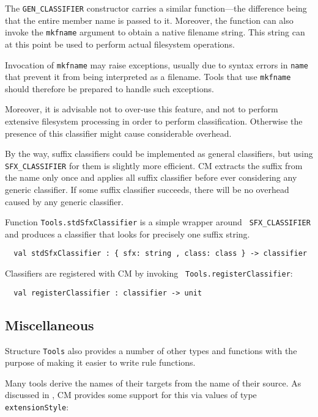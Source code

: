 The {\tt GEN\_CLASSIFIER} constructor carries a similar function---the
difference being that the entire member name is passed to it.
Moreover, the function can also invoke the {\tt mkfname} argument to
obtain a native filename string.  This string can at this point be
used to perform actual filesystem operations.

Invocation of {\tt mkfname} may raise exceptions, usually due to
syntax errors in {\tt name} that prevent it from being interpreted as
a filename.  Tools that use {\tt mkfname} should therefore be prepared
to handle such exceptions.

Moreover, it is advisable not to over-use this feature, and not to
perform extensive filesystem processing in order to perform
classification.  Otherwise the presence of this classifier might cause
considerable overhead.

By the way, suffix classifiers could be implemented as general
classifiers, but using {\tt SFX\_CLASSIFIER} for them is slightly more
efficient.  CM extracts the suffix from the name only once and applies
all suffix classifier before ever considering any generic classifier.
If some suffix classifier succeeds, there will be no overhead caused
by any generic classifier.

Function {\tt Tools.stdSfxClassifier} is a simple wrapper around {\tt
SFX\_CLASSIFIER} and produces a classifier that looks for precisely
one suffix string.

\begin{lstlisting}
  val stdSfxClassifier : { sfx: string , class: class } -> classifier
\end{lstlisting}%

Classifiers are registered with CM by invoking {\tt
Tools.registerClassifier}:

\begin{lstlisting}
  val registerClassifier : classifier -> unit
\end{lstlisting}%

\subsection{Miscellaneous}

Structure {\tt Tools} also provides a number of other types and
functions with the purpose of making it easier to write rule
functions.

 Many tools derive the names of
their targets from the name of their source.  As discussed in
, CM provides some support for this via
values of type {\tt extensionStyle}:

